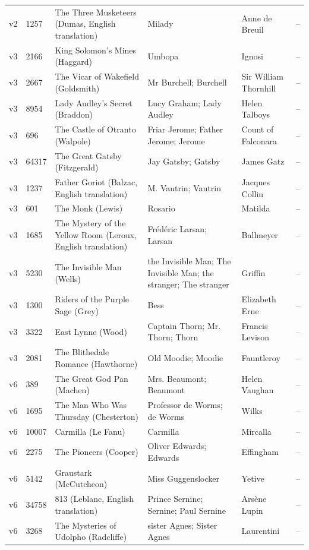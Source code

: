 \documentclass[11pt]{article}
\begin{document}
{\begin{longtable}{p{0.9cm}p{0.9cm}p{4.0cm}p{3.3cm}p{3.0cm}p{1.8cm}}
v2 & 1257 & The Three Musketeers (Dumas, English translation) & Milady & Anne de Breuil & -- \\
v3 & 2166 & King Solomon's Mines (Haggard) & Umbopa & Ignosi & -- \\
v3 & 2667 & The Vicar of Wakefield (Goldsmith) & Mr Burchell; Burchell & Sir William Thornhill & -- \\
v3 & 8954 & Lady Audley's Secret (Braddon) & Lucy Graham; Lady Audley & Helen Talboys & -- \\
v3 & 696 & The Castle of Otranto (Walpole) & Friar Jerome; Father Jerome; Jerome & Count of Falconara & -- \\
v3 & 64317 & The Great Gatsby (Fitzgerald) & Jay Gatsby; Gatsby & James Gatz & -- \\
v3 & 1237 & Father Goriot (Balzac, English translation) & M. Vautrin; Vautrin & Jacques Collin & -- \\
v3 & 601 & The Monk (Lewis) & Rosario & Matilda & -- \\
v3 & 1685 & The Mystery of the Yellow Room (Leroux, English translation) & Frédéric Larsan; Larsan & Ballmeyer & -- \\
v3 & 5230 & The Invisible Man (Wells) & the Invisible Man; The Invisible Man; the stranger; The stranger & Griffin & -- \\
v3 & 1300 & Riders of the Purple Sage (Grey) & Bess & Elizabeth Erne & -- \\
v3 & 3322 & East Lynne (Wood) & Captain Thorn; Mr. Thorn; Thorn & Francis Levison & -- \\
v3 & 2081 & The Blithedale Romance (Hawthorne) & Old Moodie; Moodie & Fauntleroy & -- \\
v6 & 389 & The Great God Pan (Machen) & Mrs. Beaumont; Beaumont & Helen Vaughan & -- \\
v6 & 1695 & The Man Who Was Thursday (Chesterton) & Professor de Worms; de Worms & Wilks & -- \\
v6 & 10007 & Carmilla (Le Fanu) & Carmilla & Mircalla & -- \\
v6 & 2275 & The Pioneers (Cooper) & Oliver Edwards; Edwards & Effingham & -- \\
v6 & 5142 & Graustark (McCutcheon) & Miss Guggenslocker & Yetive & -- \\
v6 & 34758 & 813 (Leblanc, English translation) & Prince Sernine; Sernine; Paul Sernine & Arsène Lupin & -- \\
v6 & 3268 & The Mysteries of Udolpho (Radcliffe) & sister Agnes; Sister Agnes & Laurentini & -- \\

\end{longtable}}
\end{document}
